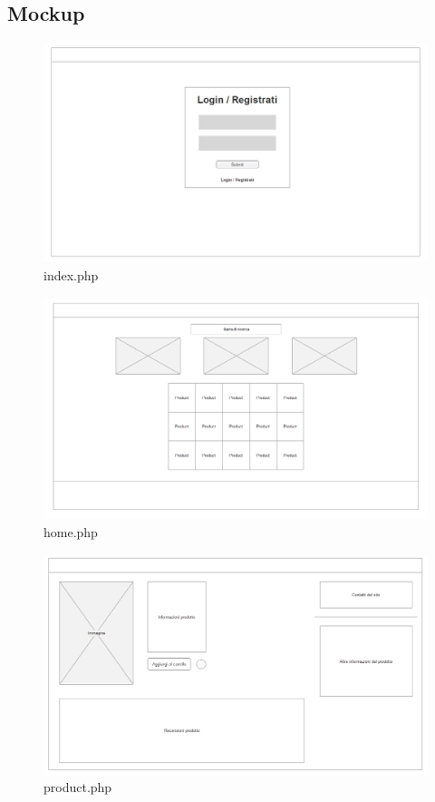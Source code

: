 \documentclass[14pt]{extarticle}
\begin{document}
\subsection{Mockup}
\FloatBarrier
\begin{figure}
    \includegraphics[width=\linewidth]{mocanu/mockup/Index.png}
    \caption{index.php}
    \label{fig:index.php}
\end{figure}
\begin{figure}
    \includegraphics[width=\linewidth]{mocanu/mockup/Home.png}
    \caption{home.php}
    \label{fig:home.php}
\end{figure}
\begin{figure}
    \includegraphics[width=\linewidth]{mocanu/mockup/Product.png}
    \caption{product.php}
    \label{fig:product.php}
\end{figure}
\end{document}
